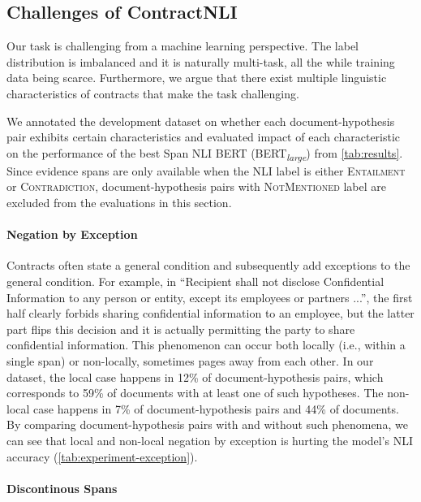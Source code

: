 

\subsection{Challenges of ContractNLI}\label{sec:discussion-observations}

Our task is challenging from a machine learning perspective.
The label distribution is imbalanced and it is naturally multi-task, all the while training data being scarce.
Furthermore, we argue that there exist multiple linguistic characteristics of contracts that make the task challenging.

We annotated the development dataset on whether each document-hypothesis pair exhibits certain characteristics and evaluated impact of each characteristic on the performance of the best Span NLI BERT (BERT\textsubscript{\textit{large}}) from \cref{tab:results}.
Since evidence spans are only available when the NLI label is either \textsc{Entailment} or \textsc{Contradiction}, document-hypothesis pairs with \textsc{NotMentioned} label are excluded from the evaluations in this section.

\paragraph{Negation by Exception}

Contracts often state a general condition and subsequently add exceptions to the general condition.
For example, in ``Recipient shall not disclose Confidential Information to any person or entity, except its employees or partners ...'', the first half clearly forbids sharing confidential information to an employee, but the latter part flips this decision and it is actually permitting the party to share confidential information.
This phenomenon can occur both locally (i.e., within a single span) or non-locally, sometimes pages away from each other.
In our dataset, the local case happens in 12\% of document-hypothesis pairs, which corresponds to 59\% of documents with at least one of such hypotheses.
The non-local case happens in 7\% of document-hypothesis pairs and 44\% of documents.
By comparing document-hypothesis pairs with and without such phenomena, we can see that local and non-local negation by exception is hurting the model's NLI accuracy (\cref{tab:experiment-exception}).



\paragraph{Discontinous Spans}

